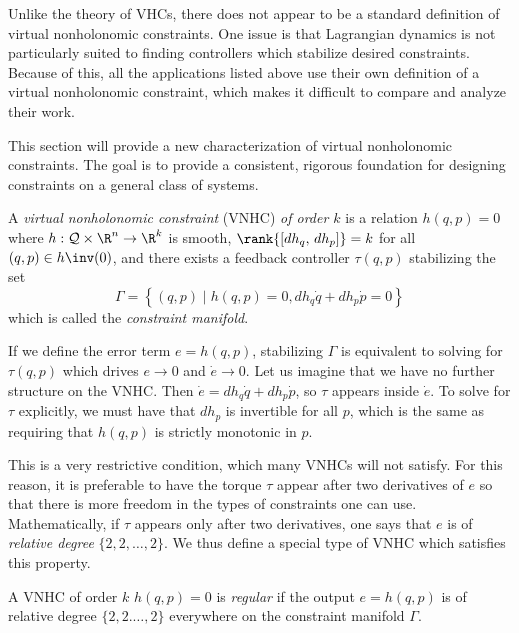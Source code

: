 Unlike the theory of VHCs, there does not appear to be a standard definition of virtual
nonholonomic constraints. One issue is that Lagrangian dynamics is not
particularly suited to finding controllers which stabilize desired constraints. Because
of this, all the applications listed above use their own definition of a virtual
nonholonomic constraint, which makes it difficult to compare and analyze their
work.

This section will provide a new characterization of virtual nonholonomic
constraints. The goal is to provide a consistent, rigorous foundation for
designing constraints on a general class of systems.

\begin{defn}
    A \textit{virtual nonholonomic constraint} (VNHC) \textit{of order \(k\)} is a
    relation \(h(q,p) = 0\) where \(h : \mathcal{Q}\times\R^n \rightarrow \R^k\) is
    smooth, \(\rank{\left[ dh_q,\, dh_p \right]} = k\) for all 
    \((q,p) \in h\inv(0)\), and there exists a feedback controller \(\tau(q,p)\)
    stabilizing the set
    \[
        \Gamma = \left\{(q,p) \mid h(q,p) = 0, dh_q \dot{q} + dh_p \dot{p} = 0\right\}
    \]
    which is called the \textit{constraint manifold}.
\end{defn}

If we define the error term  \(e = h(q,p)\), stabilizing \(\Gamma\) is
equivalent to solving for \(\tau(q,p)\) which drives \(e \rightarrow 0\) and
\(\dot{e} \rightarrow 0\).
Let us imagine that we have no further structure on the VNHC. 
Then \(\dot{e} = dh_q \dot{q} + dh_p \dot{p}\), so \(\tau\) appears inside
\(\dot{e}\). To solve for \(\tau\) explicitly, we must have that \(dh_p\) is
invertible for all \(p\), which is the same as requiring that \(h(q,p)\) is
strictly monotonic in \(p\).

This is a very restrictive condition, which many VNHCs will not satisfy. For
this reason, it is preferable to have the torque \(\tau\) appear after two 
derivatives of \(e\) so that there is more freedom in the types of constraints
one can use.
Mathematically, if \(\tau\) appears only after two derivatives, one says 
that \(e\) is of \textit{relative degree} \(\{2,2,\ldots,2\}\). 
We thus define a special type of VNHC which satisfies this
property.

\begin{defn}
    A VNHC of order \(k\) \(h(q,p) = 0\) is \textit{regular} if the output 
    \(e = h(q,p)\) is of relative degree \(\{2,2.\ldots,2\}\) everywhere on the
    constraint manifold \(\Gamma\).
\end{defn}

